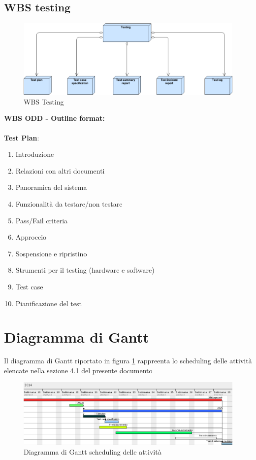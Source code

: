 \subsection{WBS testing}
\begin{figure}[ht]
\centering
\includegraphics[width=\textwidth]{img/WBS_testing.png}
\caption{WBS Testing} 
\end{figure}
\textbf{WBS ODD - Outline format:}\\ \\
\textbf{Test Plan}:
\begin{enumerate}
\item Introduzione
\item Relazioni con altri documenti
\item Panoramica del sistema
\item Funzionalità da testare/non testare
\item Pass/Fail criteria
\item Approccio
\item Sospensione e ripristino
\item Strumenti per il testing (hardware e software)
\item Test case
\item Pianificazione del test
\end{enumerate}
\clearpage

\section{Diagramma di Gantt}
Il diagramma di Gantt riportato in figura \ref{gantMain} rappreenta lo scheduling delle attività elencate nella sezione 4.1 del presente documento
\begin{figure}[ht]
\centering
\includegraphics[width=\textwidth]{Gantt/Generic.png} 
\caption{Diagramma di Gantt scheduling delle attività}
\label{gantMain}
\end{figure}

